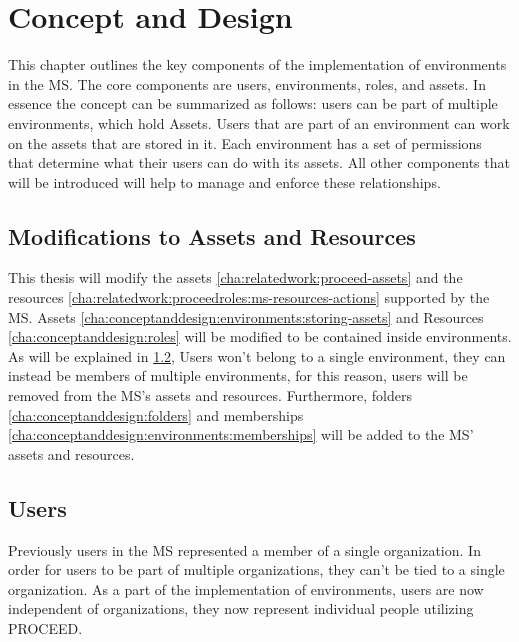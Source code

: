 \chapter{Concept and Design}
\label{cha:conceptanddesign}

This chapter outlines the key components of the implementation of environments in the MS.
The core components are users, environments, roles, and assets.
In essence the concept can be summarized as follows: users can be part of multiple
environments, which hold Assets.
Users that are part of an environment can work on the assets that are stored in it.
Each environment has a set of permissions that determine what their users can do with its
assets.
All other components that will be introduced will help to manage and enforce these relationships.

\section{Modifications to Assets and Resources}

This thesis will modify the assets \ref{cha:relatedwork:proceed-assets} and the resources
\ref{cha:relatedwork:proceedroles:ms-resources-actions} supported by the MS.
Assets \ref{cha:conceptanddesign:environments:storing-assets} and 
Resources \ref{cha:conceptanddesign:roles} will be modified to be contained inside environments.
As will be explained in \ref{cha:conceptanddesign:users}, Users won't belong to a single
environment, they can instead be members of multiple environments, for this reason, 
users will be removed from the MS's assets and resources.
Furthermore, folders \ref{cha:conceptanddesign:folders} and  memberships
\ref{cha:conceptanddesign:environments:memberships} will be added to the MS' assets and
resources.

\section{Users}
\label{cha:conceptanddesign:users}

Previously users in the MS represented a member of a single organization.
In order for users to be part of multiple organizations, they can't be tied to a single
organization.
As a part of the implementation of environments, users are now independent of
organizations,
they now represent individual people utilizing PROCEED.


